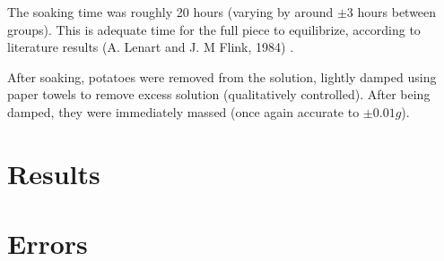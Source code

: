\documentclass[prl,twocolumn,amsmath,amssymb,superscriptaddress]{revtex4-2}
\begin{document}
The soaking time was roughly 20 hours (varying by around $\pm 3$ hours between groups). This is adequate time for the full piece to equilibrize, according to literature results  (A. Lenart and J. M Flink, 1984) \cite{https://doi.org/10.1111/j.1365-2621.1984.tb00327.x}.

After soaking, potatoes were removed from the solution, lightly damped using paper towels to remove excess solution (qualitatively controlled). After being damped, they were immediately massed (once again accurate to $\pm 0.01g$).


\section{Results}

\section{Errors}


\end{document}
